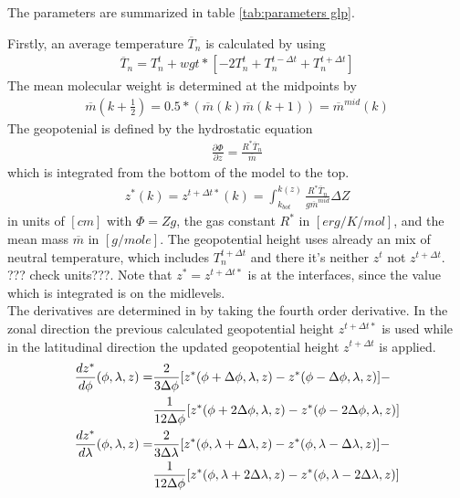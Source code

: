 %
The parameters are summarized in table \ref{tab:parameters glp}.
%
\begin{table}[tb]
\caption{Parameters of  i.e. } \label{tab:parameters glp}
\end{table}
%
Firstly, an average temperature $\overline{T}_n$ is calculated by
using
%
\begin{align}
  \overline{T}_n = T_n^t + wgt* \left[ -2 T_n^t + T_n^{t- \Delta t} + T_n^{t+ \Delta t}\right]
\end{align}
%
The mean molecular weight is determined at the midpoints by
%
\begin{align}
  \overline{m}(k+\frac{1}{2}) =
  0.5*(\overline{m}(k)\overline{m}(k+1))=\overline{m}^{mid}(k)
\end{align}
%
The geopotenial is defined by the hydrostatic equation
%
\begin{align}
  \frac{\partial \Phi}{\partial z}= \frac{R^* \overline{T}_n}{\overline{m}}
\end{align}
%
which is integrated from the bottom of the model to the top.
%
\begin{align}
 z^*(k) = z^{t+\Delta t*}(k) = \int_{k_{bot}}^{k(z)} \frac{R^*
  \overline{T}_n}{g \overline{m}^{mid}} \Delta Z
\end{align}
%
in units of $[cm]$ with $\Phi = Z g$, the gas constant $R^*$ in
$[erg/K/mol]$, and the mean mass $\overline{m}$ in $[g/mole]$. The
geopotential height uses already an mix of neutral temperature,
which includes $T_n^{t+\Delta t}$ and there it's neither $z^t$ not
$z^{t+ \Delta t}$. ??? check units???. Note that $z^* = z^{t+\Delta
t*}$ is at the interfaces, since the value which
is integrated is on the midlevels. \\
%
The derivatives are determined in  by taking
the fourth order derivative. In the zonal direction the previous
calculated geopotential height $z^{t+\Delta t*}$ is used while in the
latitudinal direction the updated geopotential height  $z^{t+\Delta
t}$ is applied.
%
\begin{align}
  \frac{d z^*}{d \phi}(\phi,\lambda,z) = & \frac{2}{3 \Delta \phi}[
   z^*(\phi+\Delta \phi,\lambda,z) -
  z^*(\phi-\Delta \phi,\lambda,z)] - \notag \\
  {} & \frac{1}{12 \Delta \phi}[z^*(\phi+2\Delta \phi,\lambda,z)-z^*(\phi-2\Delta \phi,\lambda,z)] \\
  \frac{d z^*}{d \lambda}(\phi,\lambda,z) = & \frac{2}{3 \Delta \lambda}[ z^*(\phi,\lambda+\Delta \lambda,z) -
  z^*(\phi,\lambda-\Delta \lambda,z)] -  \notag \\
  {} & \frac{1}{12 \Delta \phi}[z^*(\phi,\lambda+2\Delta \lambda,z)-z^*(\phi,\lambda-2\Delta \lambda,z)]
\end{align}
